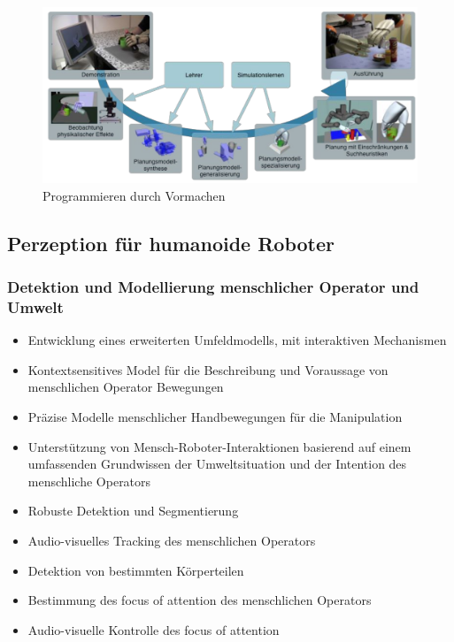\begin{figure}[h!]
	\centering
	\includegraphics[width=.8\textwidth]{figures/pdv.png}
	\caption{Programmieren durch Vormachen}
\end{figure}
\newpage
\subsection{Perzeption für humanoide Roboter}
\subsubsection{Detektion und Modellierung menschlicher Operator und Umwelt}
\begin{itemize}
	\item Entwicklung eines erweiterten Umfeldmodells, mit interaktiven Mechanismen
	\item Kontextsensitives Model für die Beschreibung und Voraussage von menschlichen Operator Bewegungen
	\item Präzise Modelle menschlicher Handbewegungen für die Manipulation
	\item Unterstützung von Mensch-Roboter-Interaktionen basierend auf einem umfassenden Grundwissen der Umweltsituation und der Intention des menschliche Operators
	\item Robuste Detektion und Segmentierung
	\item Audio-visuelles Tracking des menschlichen Operators
	\item Detektion von bestimmten Körperteilen
	\item Bestimmung des \glqq focus of attention\grqq{} des menschlichen Operators
	\item Audio-visuelle Kontrolle des \glqq focus of attention\grqq
\end{itemize}

